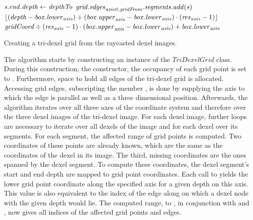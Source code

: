 \begin{algorithm}
\begin{algorithmic}[1]
								\EndIf
									\State $\mathit{s}.\mathit{end}.\mathit{depth} \gets \mathit{depthTo}$
								\EndIf
								\State $\mathit{grid}.\mathit{edges}_{\mathit{axis0}, \mathit{gridFrom}}.\mathit{segments}.\mathit{add}(\mathit{s})$
							\EndFor
						\EndFor
					\EndFor
				\EndFor
			\EndFor
		\EndFunction
		\\
			\State \Return $\lfloor(\mathit{depth} - \mathit{box}.\mathit{lower}_{\mathit{axis}}) \div (\mathit{box}.\mathit{upper}_{\mathit{axis}} - \mathit{box}.\mathit{lower}_{\mathit{axis}}) \cdot (\mathit{res}_{\mathit{axis}} - 1)\rfloor$
		\EndFunction
		\\
			\State \Return $\mathit{gridCoord} \div (\mathit{res}_{\mathit{axis}} - 1) \cdot (\mathit{box}.\mathit{upper}_{\mathit{axis}} - \mathit{box}.\mathit{lower}_{\mathit{axis}}) + \mathit{box}.\mathit{lower}_{\mathit{axis}}$
		\EndFunction
	\end{algorithmic}
	\caption{
		Creating a tri-dexel grid from the raycasted dexel images.
	}
	\label{alg:tri_dexel_grid_generation}
\end{algorithm}
%
The algorithm starts by constructing an instance of the $TriDexelGrid$ class.
During this construction, \ie the constructor, the occupancy of each grid point is set to \False.
Furthermore, space to hold all edges of the tri-dexel grid is allocated.
Accessing grid edges, \ie subscripting the member , is done by supplying the axis to which the edge is parallel as well as a three dimensional position.
Afterwards, the algorithm iterates over all three axes of the coordinate system and therefore over the three dexel images of the tri-dexel image.
For each dexel image, further loops are necessary to iterate over all dexels of the image and for each dexel over its segments.
For each segment, the affected range of grid points is computed.
Two coordinates of these points are already known, which are the same as the coordinates of the dexel in its image.
The third, missing coordinates are the ones spanned by the dexel segment.
To compute these coordinates, the dexel segment's start and end depth are mapped to grid point coordinates.
Each call to  yields the lower grid point coordinate along the specified axis for a given depth on this axis.
This value is also equivalent to the index of the edge along  on which a dexel node with the given depth would lie.
The computed range,  to , in conjunction with  and , now gives all indices of the affected grid points and edges.
